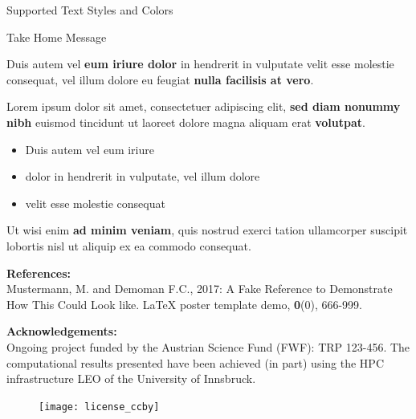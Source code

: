 \documentclass[final]{beamer}
\begin{document}
\begin{frame}[fragile]
\begin{columns}[t]
\begin{rightcolumn}
\begin{boxblock}{Supported Text Styles and Colors}
   \end{boxblock}

   \begin{boxblock}{Take Home Message}

      Duis autem vel {\bf eum iriure dolor} in hendrerit in vulputate velit esse molestie
      consequat, vel illum dolore eu feugiat {\bf nulla facilisis at vero}.

      \vspace{1em}
      Lorem ipsum dolor sit amet, consectetuer
      adipiscing elit, {\bf sed diam nonummy nibh} euismod tincidunt ut laoreet dolore
      magna aliquam erat {\bf volutpat}.   

      \vspace{1em}
      \begin{itemize}
         \item Duis autem vel eum iriure
         \item dolor in hendrerit in vulputate, vel illum dolore
         \item velit esse molestie consequat
      \end{itemize}
      
      \vspace{1em}
      Ut wisi enim {\bf ad minim veniam}, quis nostrud exerci tation ullamcorper suscipit
      lobortis nisl ut aliquip ex ea commodo consequat.
      
   \end{boxblock}

   \begin{footnotesize}
   
   \vspace{0.3cm}
   \begin{minipage}[t]{0.75\textwidth}
      \textbf{References:} \\
      Mustermann, M. and Demoman F.C., 2017:
        A Fake Reference to Demonstrate How This Could Look like.
        LaTeX poster template demo, \textbf{0}(0), 666-999.
      \vspace{1cm}
   
      \textbf{Acknowledgements:} \\
      Ongoing project funded by the Austrian Science Fund (FWF): TRP 123-456.
      The computational results presented have been achieved (in part) using
      the HPC infrastructure LEO of the University of Innsbruck.
   \end{minipage}
   \hfill
   \begin{minipage}[t]{0.12\textwidth}
      \begin{figure}
         \texttt{[image: license\_ccby]}
         \vspace{5mm}
   

\end{figure}
\end{minipage}
\end{footnotesize}
\end{rightcolumn}
\end{columns}
\end{frame}
\end{document}
